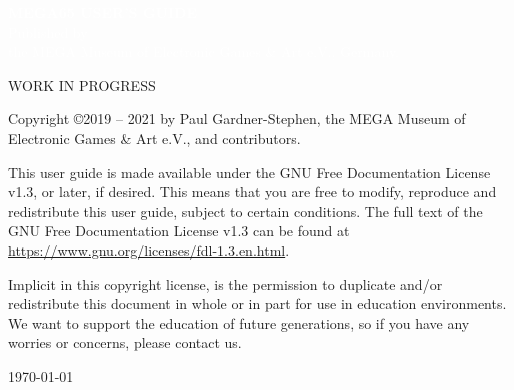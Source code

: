 \def\printmanual{true}







\cleardoublepage


 \begin{titlepage}
 \pagecolor{blue}
 \begin{center}
 {
    \large
    \vspace*{2cm}
    {\Huge\textcolor{white}{\bf{MEGA65 USER'S GUIDE}}}\\
    \vspace{\fill}
    {\textcolor{white}
    {Published by \\ the MEGA Museum of Electronic Games \& Art e.V., Germany.}}
 }
 \end{center}
 \end{titlepage}

  \pagecolor{white}\textcolor{black}
  \vfill
  WORK IN PROGRESS

  Copyright \copyright 2019 -- 2021 by Paul Gardner-Stephen,
  the MEGA Museum of Electronic Games \& Art e.V.,
  and contributors.

  This user guide is made available under the GNU Free Documentation
  License v1.3, or later, if desired. This means that you are free to
  modify, reproduce  and redistribute this user guide, subject to
  certain conditions. The full text of the GNU Free Documentation
  License v1.3 can be found at
  \url{https://www.gnu.org/licenses/fdl-1.3.en.html}.

  Implicit in this copyright license, is the permission to duplicate
  and/or redistribute this document in whole or in part for use in
  education environments. We want to support the education of future
  generations, so if you have any worries or concerns, please contact us.

   \par\today

\pagestyle{onlynumber}
\pagecolor{white}

